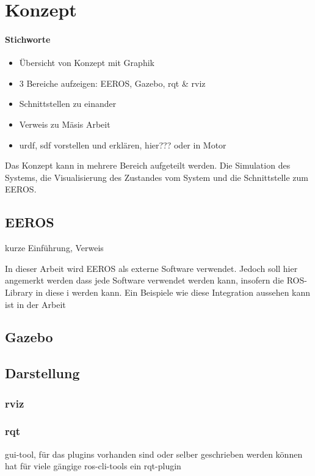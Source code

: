 \chapter{Konzept}
\subsubsection*{Stichworte}
\begin{itemize}
\item Übersicht von Konzept mit Graphik
\item 3 Bereiche aufzeigen: EEROS, Gazebo, rqt \& rviz
\item Schnittstellen zu einander
\item Verweis zu Mäsis Arbeit
\item urdf, sdf vorstellen und erklären, hier??? oder in Motor
\end{itemize}

Das Konzept kann in mehrere Bereich aufgeteilt werden.
Die Simulation des Systems, die Visualisierung des Zustandes vom System und die Schnittstelle zum EEROS.



\section{EEROS}
kurze Einführung, Verweis

In dieser Arbeit wird EEROS als externe Software verwendet.
Jedoch soll hier angemerkt werden dass jede Software verwendet werden kann, insofern die ROS-Library in diese i werden kann.
Ein Beispiele wie diese Integration aussehen kann ist in der Arbeit %


\section{Gazebo}

\section{Darstellung}
\subsection{rviz}
\subsection{rqt}
gui-tool, für das plugins vorhanden sind oder selber geschrieben werden können
hat für viele gängige ros-cli-tools ein rqt-plugin


